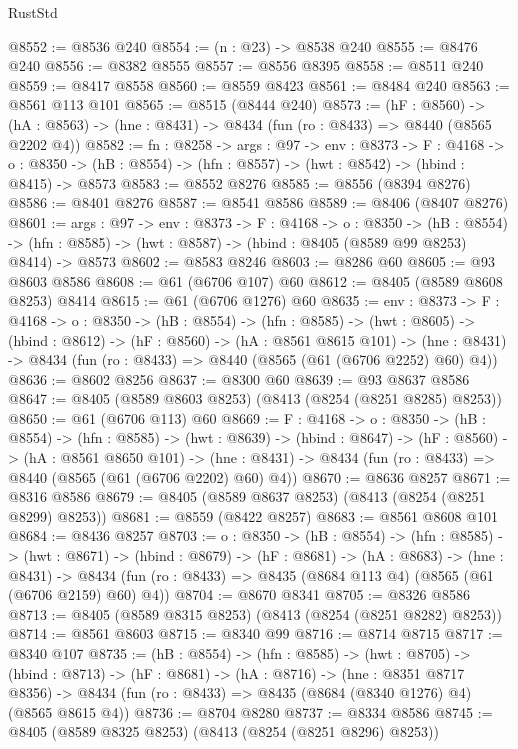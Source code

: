 \begin{lexlean}{RustStd}
\begin{coremodule}
@8552 := @8536 @240
@8554 := (n : @23) -> @8538 @240
@8555 := @8476 @240
@8556 := @8382 @8555
@8557 := @8556 @8395
@8558 := @8511 @240
@8559 := @8417 @8558
@8560 := @8559 @8423
@8561 := @8484 @240
@8563 := @8561 @113 @101
@8565 := @8515 (@8444 @240)
@8573 := (hF : @8560) ->
  (hA : @8563) -> (hne : @8431) -> @8434 (fun (ro : @8433) => @8440 (@8565 @2202 @4))
@8582 := {fn : @8258} ->
  {args : @97} ->
  {env : @8373} ->
  {F : @4168} ->
  {o : @8350} -> (hB : @8554) -> (hfn : @8557) -> (hwt : @8542) -> (hbind : @8415) -> @8573
@8583 := @8552 @8276
@8585 := @8556 (@8394 @8276)
@8586 := @8401 @8276
@8587 := @8541 @8586
@8589 := @8406 (@8407 @8276)
@8601 := {args : @97} ->
  {env : @8373} ->
  {F : @4168} ->
  {o : @8350} ->
  (hB : @8554) -> (hfn : @8585) -> (hwt : @8587) -> (hbind : @8405 (@8589 @99 @8253) @8414) -> @8573
@8602 := @8583 @8246
@8603 := @8286 @60
@8605 := @93 @8603 @8586
@8608 := @61 (@6706 @107) @60
@8612 := @8405 (@8589 @8608 @8253) @8414
@8615 := @61 (@6706 @1276) @60
@8635 := {env : @8373} ->
  {F : @4168} ->
  {o : @8350} ->
  (hB : @8554) ->
  (hfn : @8585) ->
  (hwt : @8605) ->
  (hbind : @8612) ->
  (hF : @8560) ->
  (hA : @8561 @8615 @101) ->
  (hne : @8431) -> @8434 (fun (ro : @8433) => @8440 (@8565 (@61 (@6706 @2252) @60) @4))
@8636 := @8602 @8256
@8637 := @8300 @60
@8639 := @93 @8637 @8586
@8647 := @8405 (@8589 @8603 @8253) (@8413 (@8254 (@8251 @8285) @8253))
@8650 := @61 (@6706 @113) @60
@8669 := {F : @4168} ->
  {o : @8350} ->
  (hB : @8554) ->
  (hfn : @8585) ->
  (hwt : @8639) ->
  (hbind : @8647) ->
  (hF : @8560) ->
  (hA : @8561 @8650 @101) ->
  (hne : @8431) -> @8434 (fun (ro : @8433) => @8440 (@8565 (@61 (@6706 @2202) @60) @4))
@8670 := @8636 @8257
@8671 := @8316 @8586
@8679 := @8405 (@8589 @8637 @8253) (@8413 (@8254 (@8251 @8299) @8253))
@8681 := @8559 (@8422 @8257)
@8683 := @8561 @8608 @101
@8684 := @8436 @8257
@8703 := {o : @8350} ->
  (hB : @8554) ->
  (hfn : @8585) ->
  (hwt : @8671) ->
  (hbind : @8679) ->
  (hF : @8681) ->
  (hA : @8683) ->
  (hne : @8431) ->
  @8434 (fun (ro : @8433) => @8435 (@8684 @113 @4) (@8565 (@61 (@6706 @2159) @60) @4))
@8704 := @8670 @8341
@8705 := @8326 @8586
@8713 := @8405 (@8589 @8315 @8253) (@8413 (@8254 (@8251 @8282) @8253))
@8714 := @8561 @8603
@8715 := @8340 @99
@8716 := @8714 @8715
@8717 := @8340 @107
@8735 := (hB : @8554) ->
  (hfn : @8585) ->
  (hwt : @8705) ->
  (hbind : @8713) ->
  (hF : @8681) ->
  (hA : @8716) ->
  (hne : @8351 @8717 @8356) ->
  @8434 (fun (ro : @8433) => @8435 (@8684 (@8340 @1276) @4) (@8565 @8615 @4))
@8736 := @8704 @8280
@8737 := @8334 @8586
@8745 := @8405 (@8589 @8325 @8253) (@8413 (@8254 (@8251 @8296) @8253))

\end{coremodule}
\end{lexlean}
